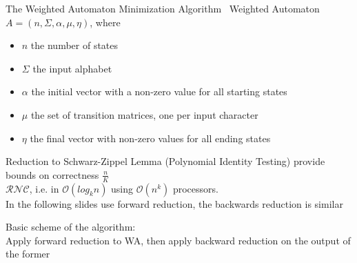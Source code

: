 \documentclass[rgb, pdf]{beamer}
\begin{document}
    \begin{frame}[allowframebreaks]{The Weighted Automaton Minimization Algorithm~\autocite{Kiefer2013OnTC}}
        Weighted Automaton $A = \left( n, \Sigma, \alpha, \mu, \eta \right)$, where
        \begin{itemize}
            \item $n$ the number of states
            \item $\Sigma$ the input alphabet
            \item $\alpha$ the initial vector with a non-zero value for all starting states
            \item $\mu$ the set of transition matrices, one per input character
            \item $\eta$ the final vector with non-zero values for all ending states
        \end{itemize}
        \vspace{7cm}
        Reduction to Schwarz-Zippel Lemma (Polynomial Identity Testing) provide bounds on correctness $\frac{n}{K}$\\ \vspace{0.5cm}
        $\mathcal{RNC}$, i.e. in $\mathcal{O}(log_k n)$ using $\mathcal{O}(n^k)$ processors. \\ \vspace{0.5cm}
        In the following slides use forward reduction, the backwards reduction is similar \\ \vspace{2cm}
        
        Basic scheme of the algorithm: \\
        Apply forward reduction to WA, then apply backward reduction on the output of the former
        \framebreak
        

\end{frame}
\end{document}
